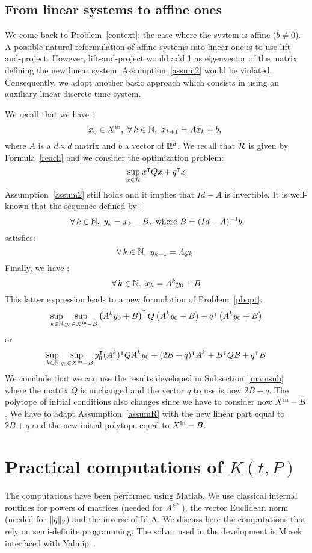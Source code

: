 \documentclass[10pt]{article}
\begin{document}
\subsection{From linear systems to affine ones}
\label{affine}
We come back to Problem~\eqref{context}: the case where the system is affine ($b\neq 0$).
A possible natural reformulation of affine systems into linear one is to use lift-and-project. However, lift-and-project would add 1 as eigenvector of the matrix defining the new linear system. Assumption~\ref{assum2} would be violated.  Consequently, we adopt another basic approach which consists in using an auxiliary linear discrete-time system.   

 We recall that we have :
\[
x_0\in \xin,\ \forall\, k\in\nn,\ x_{k+1}=A x_k+b,\
\]
where $A$ is a $d\times d$ matrix and $b$ a vector of $\mathbb R^d$. We recall that $\mathcal{R}$ is given by Formula~\eqref{reach} and we consider the optimization problem:
\[
\sup_{x\in\mathcal{R}} x^\intercal Q x+q^\intercal x
\]
Assumption~\ref{assum2} still holds and it implies that $Id-A$ is invertible. It is well-known that the sequence defined by :
\[
\forall\, k\in\mathbb{N},\ y_k=x_k-B,\text{ where } B=(Id-A)^{-1} b
\]
satisfies:
\[
\forall\, k\in\mathbb{N},\ y_{k+1}=A y_k. 
\]
Finally, we have :
\[
\forall\, k\in\nn,\ x_k=A^k y_0+B
\]
This latter expression leads to a new formulation of Problem~\eqref{pbopt}: 
\[
\sup_{k\in\mathbb{N}} \sup_{y_0\in X^\mathrm{in}-B} \left(A^k y_0+B\right)^\intercal Q  \left(A^k y_0+B\right)+q^\intercal  \left(A^k y_0+B\right)
\]
or
\[
\sup_{k\in\mathbb{N}} \sup_{y_0\in X^\mathrm{in}-B} y_0^\intercal (A^k)^\intercal Q  A^k y_0+(2B+q)^\intercal A^k +B^\intercal Q B+q^\intercal B
\]
We conclude that we can use the results developed in Subsection~\ref{mainsub} where the matrix $Q$ is unchanged and the vector $q$ to use is now $2B+q$. The polytope of initial conditions also changes since we have to consider now $X^\mathrm{in}-B$. We have to adapt Assumption~\ref{assumR} with the new linear part equal to $2B+q$ and the new initial polytope equal to $X^\mathrm{in}-B$.

\section{Practical computations of $K(t,P)$}
\label{computations}
The computations have been performed using Matlab. We use classical internal routines for powers of matrices (needed for $A^{k^{>}}$), the vector Euclidean norm (needed for $\| q\|_2$) and the inverse of Id-A. We discuss here the computations that rely on semi-definite programming. The solver used in the development is Mosek~\cite{andersen2000mosek} interfaced with Yalmip~\cite{Lofberg2004}. 
\end{document}
